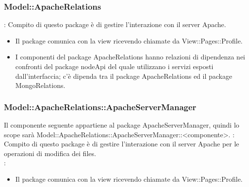 \subsubsection{Model::ApacheRelations}{
		\textbf{\tipo}: Compito di questo package è di gestire l'interazione con il server Apache.\\
		\begin{itemize}
			\item Il package comunica con la view ricevendo chiamate da View::Pages::Profile.
			\item I componenti del package ApacheRelations hanno relazioni di dipendenza nei confronti del package nodeApi del quale utilizzano i servizi esposti dall’interfaccia; c’è dipenda tra il package ApacheRelations ed il package MongoRelations.\\
		\end{itemize}

\subsubsection{Model::ApacheRelations::ApacheServerManager}{
	Il componente seguente appartiene al package ApacheServerManager, quindi lo scope sarà Model::ApacheRelations::ApacheServerManager::<componente>.
		\textbf{\tipo}: Compito di questo package è di gestire l'interazione con il server Apache per le operazioni di modifica dei files.\\
		\textbf{\relaz}:
		\begin{itemize}
			\item Il package comunica con la view ricevendo chiamate da View::Pages::Profile.
		\end{itemize}

}}

